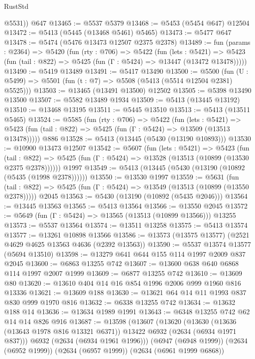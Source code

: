 \begin{lexlean}{RustStd}
\begin{coremodule}
        @5531))
    @647
@13465 := @5537 @5379
@13468 := @5453 (@5454 @647) @12504
@13472 := @5413 (@5445 (@13468 @5461) @5465)
@13473 := @5477 @647
@13478 := @5474 (@5476 @13473 @12507 @2375 @2378)
@13489 := fun (params : @2364) =>
  @5420
    (fun (rty : @706) =>
    @5422
      (fun (lets : @5421) =>
      @5423 (fun (tail : @822) => @5425 (fun (Γ : @5424) => @13447 (@13472 @13478)))))
@13490 := @5419 @13489
@13491 := @5417 @13490
@13500 := @5500
    (fun (U : @5499) => @5501 (fun (t : @7) => @5508 (@5413 (@5514 @12504 @2381) @5525)))
@13503 := @13465 (@13491 @13500) @12502
@13505 := @5398 @13490 @13500
@13507 := @5582 @13489 @1934
@13509 := @5413 (@13445 @13192)
@13510 := @13468 @13195
@13511 := @5445 @13510
@13513 := @5413 (@13511 @5465)
@13524 := @5585
    (fun (rty : @706) =>
    @5422
      (fun (lets : @5421) =>
      @5423 (fun (tail : @822) => @5425 (fun (Γ : @5424) => @13509 (@13513 @13478)))))
    @886
@13528 := @5413 (@13445 (@5430 (@13190 @10893)))
@13530 := @10900 @13473 @12507
@13542 := @5607
    (fun (lets : @5421) =>
    @5423
      (fun (tail : @822) =>
      @5425 (fun (Γ : @5424) => @13528 (@13513 (@10899 (@13530 @2375 @2378))))))
    @1997
@13549 := @5413 (@13445 (@5430 (@13190 (@10892 (@5435 (@1998 @2378))))))
@13550 := @13530 @1997
@13559 := @5631
    (fun (tail : @822) => @5425 (fun (Γ : @5424) => @13549 (@13513 (@10899 (@13550 @2378)))))
    @2045
@13563 := @5430 (@13190 (@10892 (@5435 @2046)))
@13564 := @13445 @13563
@13565 := @5413 @13564
@13566 := @13550 @2045
@13572 := @5649 (fun (Γ : @5424) => @13565 (@13513 (@10899 @13566))) @13255
@13573 := @5537 @13564
@13574 := @13511 @13258
@13575 := @5413 @13574
@13577 := @13261 @10898 @13566
@13586 := @13573 (@13575 @13577) (@2521 @4629 @4625 @13563 @4636 (@2392 @13563))
@13590 := @5537 @13574 @13577 (@5694 @13510)
@13598 := @13279 @641 @644 @155 @114 @1997 @2009 @837 @2045
@13600 := @6863 @13255 @742
@13607 := @13600 @638 @640 @6868 @114 @1997 @2007 @1999
@13609 := @6877 @13255 @742
@13610 := @13609 @80
@13620 := @13610 @404 @14 @16 @854 @1996 @2006 @999 @1960 @816 @13336
@13621 := @13609 @188
@13630 := @13621 @64 @14 @11 @1993 @837 @830 @999 @1970 @816
@13632 := @6338 @13255 @742
@13634 := @13632 @188 @14
@13636 := @13634 @1989 @1991
@13643 := @6348 @13255 @742 @62 @14 @14 @826 @916
@13687 := @13598
    (@13607
      (@13620
        (@13630 (@13636 (@13643 @1978 @816 @13321 @6371)) @13422 @6932 (@2634 (@6934 @1971 @837)))
        @6932
        (@2634 (@6934 @1961 @1996)))
      (@6947 (@6948 @1999))
      (@2634 (@6952 @1999))
      (@2634 (@6957 @1999))
      (@2634 (@6961 @1999 @6868))

\end{coremodule}
\end{lexlean}
